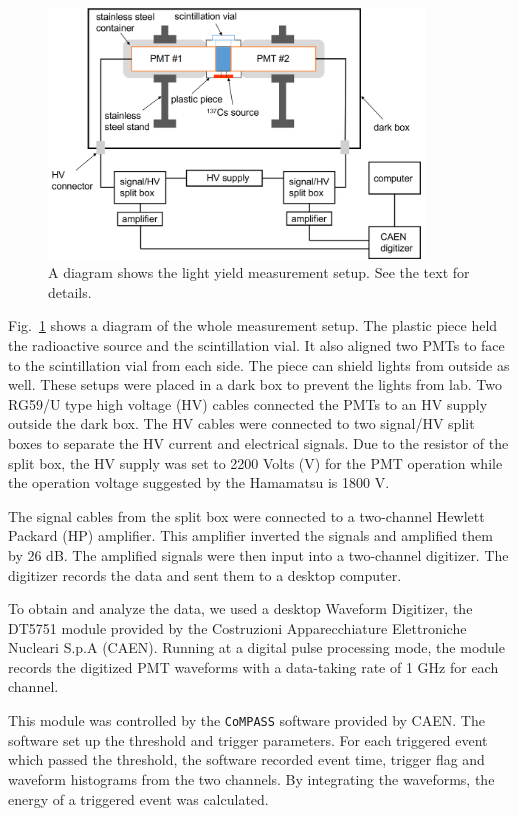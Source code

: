 \begin{figure}[htbp]
	\centering	
	\includegraphics[width=10cm]{teLSsetup.png}
	\caption{A diagram shows the light yield measurement setup. See the text for details.}
	\label{teLSsetup}
\end{figure}

Fig.~\ref{teLSsetup} shows a diagram of the whole measurement setup. The plastic piece held the radioactive source and the scintillation vial. It also aligned two PMTs to face to the scintillation vial from each side. The piece can shield lights from outside as well. These setups were placed in a dark box to prevent the lights from lab. Two RG59/U type high voltage (HV) cables connected the PMTs to an HV supply outside the dark box. The HV cables were connected to two signal/HV split boxes to separate the HV current and electrical signals. Due to the resistor of the split box, the HV supply was set to 2200 Volts (V) for the PMT operation while the operation voltage suggested by the Hamamatsu is 1800 V. 

The signal cables from the split box were connected to a two-channel Hewlett Packard (HP) amplifier. This amplifier inverted the signals and amplified them by 26 dB. The amplified signals were then input into a two-channel digitizer. The digitizer records the data and sent them to a desktop computer.

To obtain and analyze the data, we used a desktop Waveform Digitizer, the DT5751 module provided by the Costruzioni Apparecchiature Elettroniche Nucleari S.p.A (CAEN). Running at a digital pulse processing mode, the module records the digitized PMT waveforms with a data-taking rate of 1 GHz for each channel\cite{caen}.

This module was controlled by the \texttt{CoMPASS} software provided by CAEN. The software set up the threshold and trigger parameters. For each triggered event which passed the threshold, the software recorded event time, trigger flag and waveform histograms from the two channels. By integrating the waveforms, the energy of a triggered event was calculated\cite{compass}.

